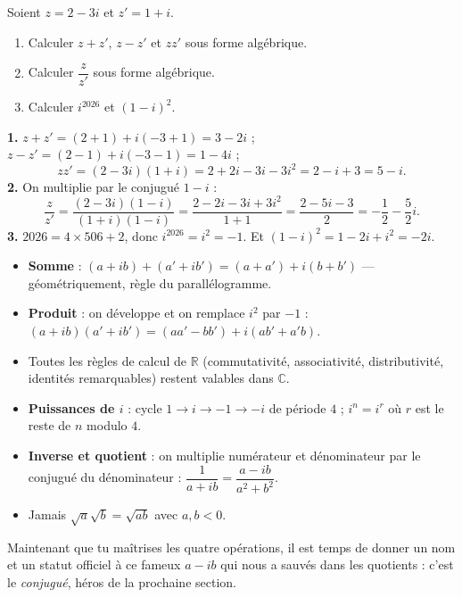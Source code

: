 \documentclass[11pt]{article}
\begin{document}
\begin{exercice}
Soient $z = 2 - 3i$ et $z' = 1 + i$.
\begin{enumerate}
\item Calculer $z + z'$, $z - z'$ et $zz'$ sous forme algébrique.
\item Calculer $\dfrac{z}{z'}$ sous forme algébrique.
\item Calculer $i^{2026}$ et $(1 - i)^2$.
\end{enumerate}
\end{exercice}

\begin{corrige}
\textbf{1.} $z + z' = (2 + 1) + i(-3 + 1) = 3 - 2i$ ; \quad $z - z' = (2 - 1) + i(-3 - 1) = 1 - 4i$ ;
\[ zz' = (2 - 3i)(1 + i) = 2 + 2i - 3i - 3i^2 = 2 - i + 3 = 5 - i. \]
\textbf{2.} On multiplie par le conjugué $1 - i$ :
\[ \frac{z}{z'} = \frac{(2 - 3i)(1 - i)}{(1 + i)(1 - i)} = \frac{2 - 2i - 3i + 3i^2}{1 + 1} = \frac{2 - 5i - 3}{2} = -\frac{1}{2} - \frac{5}{2}i. \]
\textbf{3.} $2026 = 4 \times 506 + 2$, donc $i^{2026} = i^2 = -1$. Et $(1 - i)^2 = 1 - 2i + i^2 = -2i$.
\end{corrige}

\begin{aretenir}
\begin{itemize}
\item \textbf{Somme} : $(a + ib) + (a' + ib') = (a + a') + i(b + b')$ — géométriquement, règle du parallélogramme.
\item \textbf{Produit} : on développe et on remplace $i^2$ par $-1$ : $(a + ib)(a' + ib') = (aa' - bb') + i(ab' + a'b)$.
\item Toutes les règles de calcul de $\mathbb{R}$ (commutativité, associativité, distributivité, identités remarquables) restent valables dans $\mathbb{C}$.
\item \textbf{Puissances de $i$} : cycle $1 \to i \to -1 \to -i$ de période $4$ ; $i^n = i^r$ où $r$ est le reste de $n$ modulo $4$.
\item \textbf{Inverse et quotient} : on multiplie numérateur et dénominateur par le conjugué du dénominateur : $\dfrac{1}{a + ib} = \dfrac{a - ib}{a^2 + b^2}$.
\item Jamais $\sqrt{a}\sqrt{b} = \sqrt{ab}$ avec $a, b < 0$.
\end{itemize}
\end{aretenir}

Maintenant que tu maîtrises les quatre opérations, il est temps de donner un nom et un statut officiel à ce fameux $a - ib$ qui nous a sauvés dans les quotients : c'est le \emph{conjugué}, héros de la prochaine section.
\end{document}
